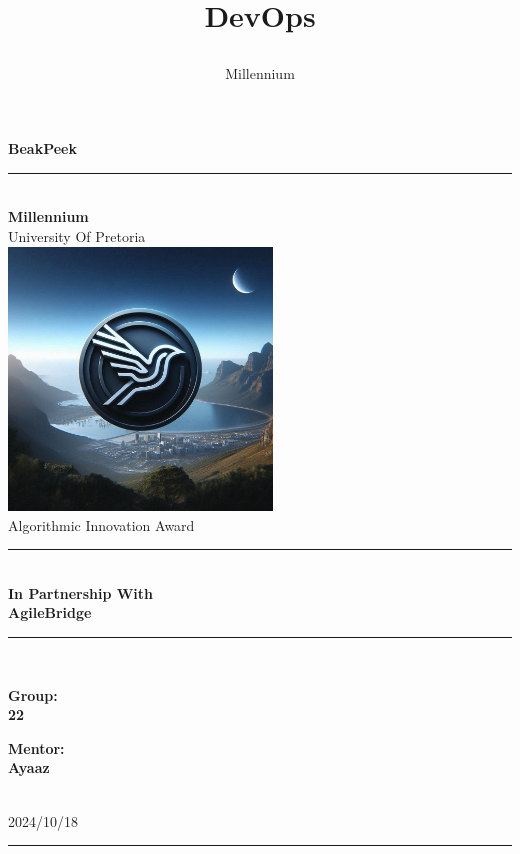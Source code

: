 \documentclass[a4paper]{article}
\title{

\\
{DevOps}
}
\author{Millennium}
\begin{document}
\begin{titlepage}

\begin{center}

{\Huge \bf BeakPeek}\\[10pt]
\rule{\textwidth}{1pt}\\[20pt]
{\bf \huge \sc Millennium} \\[10pt]
{\huge University Of Pretoria} \\[15pt]
\includegraphics[width=7cm]{../../../res/MillenniumLogo.jpeg}\\[15pt]
{\huge Algorithmic Innovation Award}\\[60pt]
\rule{8cm}{1pt}\\[5pt]
{\bf \huge \sc In Partnership With}\\[15pt]
{\huge \bf AgileBridge}\\[5pt]
\rule{8cm}{1pt}\\[50pt]

\begin{minipage}[t]{10cm}
	{\Large{\bf Group:\\ 22}}
\end{minipage}\hfill\begin{minipage}[t]{5cm}\raggedleft
	{\Large{\bf Mentor: \\Ayaaz\\ }}
\end{minipage} \\[90pt]
{\Large 2024/10/18} \\ [5pt]

\rule{\textwidth}{1pt}\\[10pt]

\end{center}

\vfill

\end{titlepage}
\end{document}
